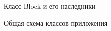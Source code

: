 \documentclass{beamer}
\begin{document}
\begin{frame}{Класс Block и его наследники}
	\begin{figure}[h]
		\label{ris:blocks}
	\end{figure}
\end{frame}





\begin{frame}{Общая схема классов приложения}
	\begin{figure}[h]
		\label{ris:all}
	\end{figure}
\end{frame}
\end{document}
